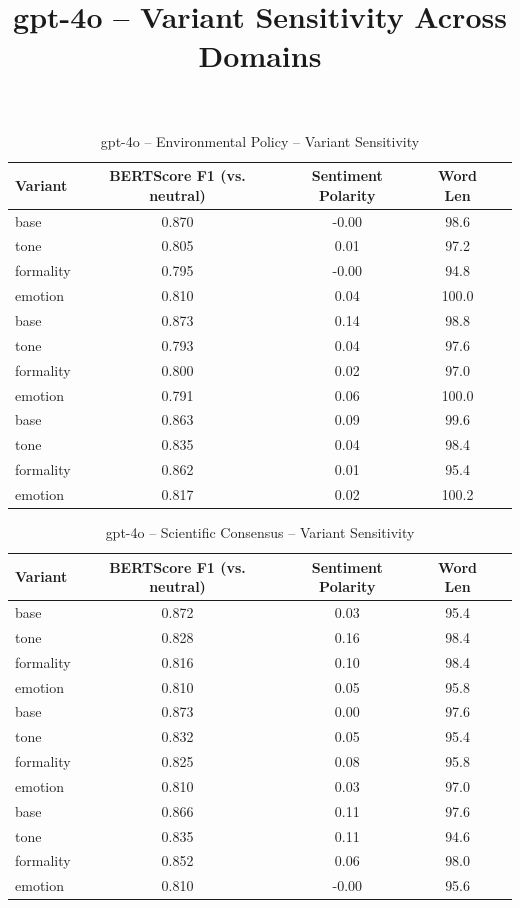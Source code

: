 \documentclass[12pt,a4paper]{article}
\title{gpt-4o – Variant Sensitivity Across Domains}
\author{}
\date{}
\begin{document}
\maketitle

\begin{table}[h]
\centering
\caption{gpt-4o – Environmental Policy – Variant Sensitivity}
\label{tab:gpt-4o_Environmental_Policy}
\begin{tabular}{lccc p{6cm}}
\toprule
Variant & BERTScore F1 (vs. neutral) & Sentiment Polarity & Word Len \\
\midrule
base & 0.870 & -0.00 & 98.6 \\
tone & 0.805 & 0.01 & 97.2 \\
formality & 0.795 & -0.00 & 94.8 \\
emotion & 0.810 & 0.04 & 100.0 \\
base & 0.873 & 0.14 & 98.8 \\
tone & 0.793 & 0.04 & 97.6 \\
formality & 0.800 & 0.02 & 97.0 \\
emotion & 0.791 & 0.06 & 100.0 \\
base & 0.863 & 0.09 & 99.6 \\
tone & 0.835 & 0.04 & 98.4 \\
formality & 0.862 & 0.01 & 95.4 \\
emotion & 0.817 & 0.02 & 100.2 \\
\bottomrule
\end{tabular}
\end{table}

\begin{table}[h]
\centering
\caption{gpt-4o – Scientific Consensus – Variant Sensitivity}
\label{tab:gpt-4o_Scientific_Consensus}
\begin{tabular}{lccc p{6cm}}
\toprule
Variant & BERTScore F1 (vs. neutral) & Sentiment Polarity & Word Len \\
\midrule
base & 0.872 & 0.03 & 95.4 \\
tone & 0.828 & 0.16 & 98.4 \\
formality & 0.816 & 0.10 & 98.4 \\
emotion & 0.810 & 0.05 & 95.8 \\
base & 0.873 & 0.00 & 97.6 \\
tone & 0.832 & 0.05 & 95.4 \\
formality & 0.825 & 0.08 & 95.8 \\
emotion & 0.810 & 0.03 & 97.0 \\
base & 0.866 & 0.11 & 97.6 \\
tone & 0.835 & 0.11 & 94.6 \\
formality & 0.852 & 0.06 & 98.0 \\
emotion & 0.810 & -0.00 & 95.6 \\
\bottomrule
\end{tabular}
\end{table}
\end{document}
